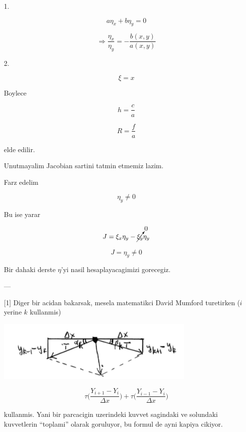 \documentclass[12pt,fleqn]{article}\usepackage{../common}
\begin{document}
1.

\[ a \eta_x + b \eta_y = 0 \]

\[ \Rightarrow \frac{\eta_x}{\eta_y} = -\frac{b(x,y)}{a(x,y)}\]

2. 

\[ \xi = x \]

Boylece 

\[ h = \frac{c}{a} \]

\[ R = \frac{f}{a} \]

elde edilir. 

Unutmayalim Jacobian sartini tatmin etmemiz lazim. 

Farz edelim 

\[ \eta_y \ne 0 \]

Bu ise yarar

\[ J = \xi_x\eta_y - \cancelto{0}{\xi_y}\eta_y \]

\[ J = \eta_y \ne 0 \]

Bir dahaki derste $\eta$'yi nasil hesaplayacagimizi gorecegiz. 

---

[1] Diger bir acidan bakarsak, mesela matematikci David Mumford
turetirken ($i$ yerine $k$ kullanmis)

\includegraphics[height=3cm]{1_15.png}

\[ 
\tau \bigg( \frac{Y_{i+1}- Y_i}{\Delta x} \bigg) +
\tau \bigg( \frac{Y_{i-1}- Y_{i}}{\Delta x} \bigg) 
\]

kullanmis. Yani bir parcacigin uzerindeki kuvvet sagindaki ve solundaki
kuvvetlerin ``toplami'' olarak goruluyor, bu formul de ayni kapiya cikiyor.
\end{document}
